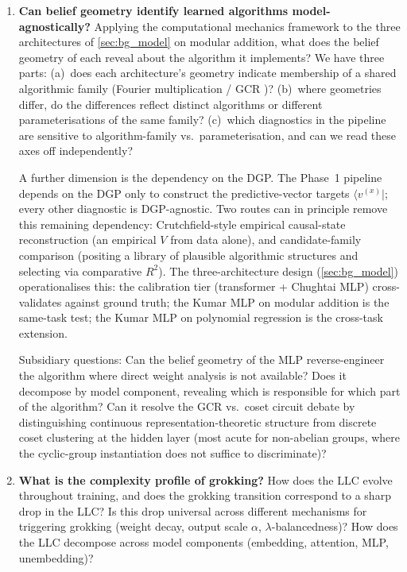 \documentclass[11pt,a4paper]{article}
\begin{document}
\begin{enumerate}[label=\textbf{RQ\arabic*.}, leftmargin=2.5em]
    \item \textbf{Can belief geometry identify learned algorithms model-agnostically?} Applying the computational mechanics framework to the three architectures of \cref{sec:bg_model} on modular addition, what does the belief geometry of each reveal about the algorithm it implements? We have three parts: (a)~does each architecture's geometry indicate membership of a shared algorithmic family (Fourier multiplication / GCR \citep{chughtai2023toy})? (b)~where geometries differ, do the differences reflect distinct algorithms or different parameterisations of the same family? (c)~which diagnostics in the pipeline are sensitive to algorithm-family vs.\ parameterisation, and can we read these axes off independently?

    A further dimension is the dependency on the DGP. The Phase~1 pipeline depends on the DGP only to construct the predictive-vector targets $\langle v^{(x)} |$; every other diagnostic is DGP-agnostic. Two routes can in principle remove this remaining dependency: Crutchfield-style empirical causal-state reconstruction \citep{shalizi2004cssr} (an empirical $V$ from data alone), and candidate-family comparison (positing a library of plausible algorithmic structures and selecting via comparative $R^2$). The three-architecture design (\cref{sec:bg_model}) operationalises this: the calibration tier (transformer + Chughtai MLP) cross-validates against ground truth; the Kumar MLP on modular addition is the same-task test; the Kumar MLP on polynomial regression is the cross-task extension.

    Subsidiary questions: Can the belief geometry of the MLP reverse-engineer the algorithm where direct weight analysis is not available? Does it decompose by model component, revealing which is responsible for which part of the algorithm? Can it resolve the GCR vs.\ coset circuit debate \citep{chughtai2023toy, stander2024grokking, wu2024unified} by distinguishing continuous representation-theoretic structure from discrete coset clustering at the hidden layer (most acute for non-abelian groups, where the cyclic-group instantiation does not suffice to discriminate)?

    \item \textbf{What is the complexity profile of grokking?} How does the LLC evolve throughout training, and does the grokking transition correspond to a sharp drop in the LLC? Is this drop universal across different mechanisms for triggering grokking (weight decay, output scale $\alpha$, $\lambda$-balancedness)? How does the LLC decompose across model components (embedding, attention, MLP, unembedding)?


\end{enumerate}
\end{document}
